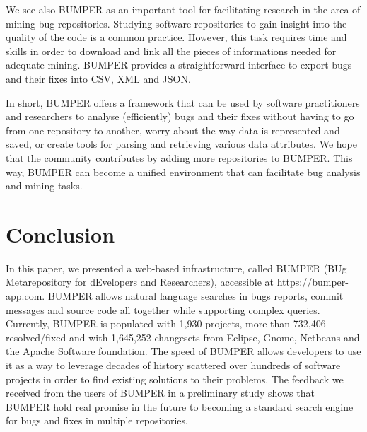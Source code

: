 \documentclass[conference]{IEEEtran}
\begin{document}
We see also BUMPER as an important tool for facilitating research in the area of mining bug repositories. Studying software repositories to gain insight into the quality of the code is a common practice. However, this task requires time and skills in order to download and link all the pieces of informations needed for adequate mining. BUMPER provides a straightforward interface to export bugs and their fixes into CSV, XML and JSON. 

In short, BUMPER offers a framework that can be used by software practitioners and researchers to analyse (efficiently) bugs and their fixes without having to go from one repository to another,  worry about the way data is represented and saved, or create tools for parsing and retrieving various data attributes. We hope that the community contributes by adding more repositories to BUMPER. This way, BUMPER can become a unified environment that can facilitate bug analysis and mining tasks.

\section{Conclusion}
\label{sec:conclusion}

In this paper, we presented a web-based infrastructure, called BUMPER (BUg Metarepository for dEvelopers and Researchers), accessible at https://bumper-app.com. BUMPER allows natural language searches in bugs reports, commit messages and source code all together while supporting complex queries. Currently, BUMPER is populated with  1,930 projects, more than 732,406 resolved/fixed and with 1,645,252 changesets from Eclipse, Gnome, Netbeans and the Apache Software foundation. The speed of BUMPER allows developers to use it as a way to leverage decades of history scattered over hundreds of software projects in order to find existing solutions to their problems. The feedback we received from the users of BUMPER in a preliminary study shows that BUMPER hold real promise in the future to becoming a standard search engine for bugs and fixes in multiple repositories. 




\end{document}
